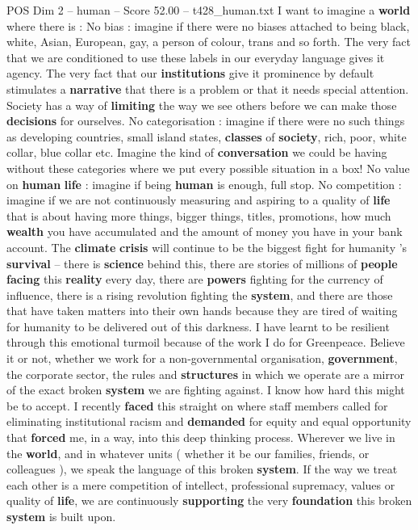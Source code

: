 \begin{textsample}{POS Dim 2 – human – Score 52.00 – t428\_human.txt}
I want to imagine a \textbf{world} where there is : No bias : imagine if there were no biases attached to being black, white, Asian, European, gay, a person of colour, trans and so forth.
The very fact that we are conditioned to use these labels in our everyday language gives it agency.
The very fact that our \textbf{institutions} give it prominence by default stimulates a \textbf{narrative} that there is a problem or that it needs special attention.
Society has a way of \textbf{limiting} the way we see others before we can make those \textbf{decisions} for ourselves.
No categorisation : imagine if there were no such things as developing countries, small island states, \textbf{classes} of \textbf{society}, rich, poor, white collar, blue collar etc.
Imagine the kind of \textbf{conversation} we could be having without these categories where we put every possible situation in a box!
No value on \textbf{human} \textbf{life} : imagine if being \textbf{human} is enough, full stop.
No competition : imagine if we are not continuously measuring and aspiring to a quality of \textbf{life} that is about having more things, bigger things, titles, promotions, how much \textbf{wealth} you have accumulated and the amount of money you have in your bank account.
The \textbf{climate} \textbf{crisis} will continue to be the biggest fight for humanity ’s \textbf{survival} – there is \textbf{science} behind this, there are stories of millions of \textbf{people} \textbf{facing} this \textbf{reality} every day, there are \textbf{powers} fighting for the currency of influence, there is a rising revolution fighting the \textbf{system}, and there are those that have taken matters into their own hands because they are tired of waiting for humanity to be delivered out of this darkness.
I have learnt to be resilient through this emotional turmoil because of the work I do for Greenpeace.
Believe it or not, whether we work for a non-governmental organisation, \textbf{government}, the corporate sector, the rules and \textbf{structures} in which we operate are a mirror of the exact broken \textbf{system} we are fighting against.
I know how hard this might be to accept.
I recently \textbf{faced} this straight on where staff members called for eliminating institutional racism and \textbf{demanded} for equity and equal opportunity that \textbf{forced} me, in a way, into this deep thinking process.
Wherever we live in the \textbf{world}, and in whatever units ( whether it be our families, friends, or colleagues ), we speak the language of this broken \textbf{system}.
If the way we treat each other is a mere competition of intellect, professional supremacy, values or quality of \textbf{life}, we are continuously \textbf{supporting} the very \textbf{foundation} this broken \textbf{system} is built upon.

\end{textsample}
